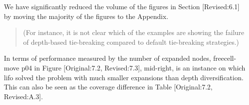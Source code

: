 \documentclass{article}
\begin{document}
We have significantly reduced the volume of the figures in Section
[Revised:6.1] by moving the majority of the figures to the Appendix.

\begin{quote}
(For
instance, it is not clear which of the examples are showing the
failure of depth-based tie-breaking compared to default tie-breaking
strategies.)
\end{quote}


In terms of performance measured by the number of expanded nodes,
freecell-move p04 in Figure [Original:7.2, Revised:7.3], mid-right,
is an instance on which lifo solved the problem
with much smaller expansions than depth diversification.
This can also be seen as the coverage difference in Table [Original:7.2, Revised:A.3].
\end{document}

